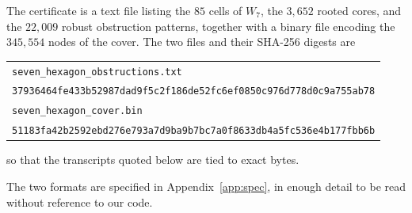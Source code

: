 \documentclass[11pt]{article}
\theoremstyle{definition}
\begin{document}
The certificate is a text file listing the $85$ cells of $W_7$, the
$3{,}652$ rooted cores, and the $22{,}009$ robust obstruction patterns,
together with a binary file encoding the $345{,}554$ nodes of the cover.
The two files and their SHA-256 digests are
\begin{center}\footnotesize
\begin{tabular}{@{}l@{}}
\texttt{seven\_hexagon\_obstructions.txt}\\
\texttt{37936464fe433b52987dad9f5c2f186de52fc6ef0850c976d778d0c9a755ab78}\\[3pt]
\texttt{seven\_hexagon\_cover.bin}\\
\texttt{51183fa42b2592ebd276e793a7d9ba9b7bc7a0f8633db4a5fc536e4b177fbb6b}
\end{tabular}
\end{center}
so that the transcripts quoted below are tied to exact bytes.

The two formats are specified in Appendix~\ref{app:spec}, in enough detail
to be read without reference to our code.
\end{document}
